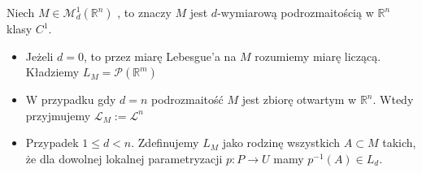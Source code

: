 \begin{defi}
    Niech $M \in \mathcal{M}_d^1(\mathbb{R}^n)$ , to znaczy $M$ jest $d$-wymiarową podrozmaitością w $\mathbb{R}^n$ klasy $C^1$.
    \begin{itemize}
        \item Jeżeli $d=0$, to przez miarę Lebesgue'a na $M$ rozumiemy miarę liczącą. Kładziemy $L_M = \mathcal{P}(\mathbb{R}^m)$
        \item W przypadku gdy $d=n$ podrozmaitość $M$ jest zbiorę otwartym w $\mathbb{R}^n$. Wtedy przyjmujemy $\mathcal{L}_M := \mathcal{L}^n$
        \item Przypadek $1 \leq d < n$. Zdefinujemy $L_M$ jako rodzinę wszystkich $A \subset M$ takich, że dla dowolnej lokalnej parametryzacji $p : P \rightarrow U$ mamy $p^{-1}(A) \in L_d$. 
    \end{itemize}
\end{defi}